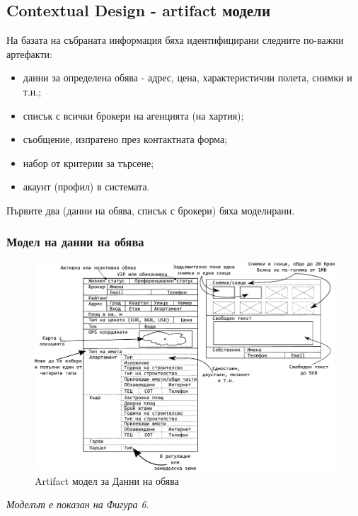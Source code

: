 \documentclass[a4paper]{article}
\begin{document}
\subsection{Contextual Design - artifact модели} \label{cdmodelsart}

На базата на събраната информация бяха идентифицирани следните по-важни артефакти:
\begin{itemize}
	\item данни за определена обява - адрес, цена, характеристични полета, снимки и т.н.;
	\item списък с всички брокери на агенцията (на хартия);
	\item съобщение, изпратено през контактната форма;
	\item набор от критерии за търсене;
	\item акаунт (профил) в системата.
\end{itemize}

Първите два (данни на обява, списък с брокери) бяха моделирани.

\subsubsection{Модел на данни на обява}	\label{artad}

	\begin{figure}[h]
	\centering
	\includegraphics[scale=0.85]{art-offer}
	\caption{Artifact модел за Данни на обява}
	\end{figure}
			
		\emph{Моделът е показан на Фигура 6.} 
		
\end{document}
